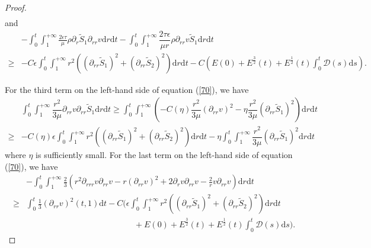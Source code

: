 \documentclass[10pt,reqno]{amsart}
\numberwithin{equation}{section}
\begin{document}
\begin{proof}
\begin{equation}
\begin{aligned}
			\end{aligned}
		\end{equation}
		and
		\begin{equation}\nonumber
			\begin{aligned}
				&-\int_{0}^{t}\int_{1}^{+\infty}\frac{2\epsilon\tau}{\mu}\rho\partial_{r} \tilde{S}_1\partial_{rr}v\mathrm{d}r\mathrm{d}t
				-\int_{0}^{t}\int_{1}^{+\infty}\dfrac{2\tau\epsilon}{\mu r}\rho \partial_{rr}v\tilde{S}_1\mathrm{d}r\mathrm{d}t\\
				\geq&-C\epsilon\int_{0}^{t}\int_{1}^{+\infty}r^2\left((\partial_{rr} \tilde{S}_1)^2+(\partial_{rr} \tilde{S}_2)^2\right)\mathrm{d}r\mathrm{d}t
				-C\left(E(0)+ E^{\frac{3}{2}}(t)+ E^{\frac{1}{2}}(t) \int_{0}^{t}\mathcal{D}(s)\mathrm{d}s\right).
			\end{aligned}
		\end{equation}
		
		For the third term on the left-hand side of equation (\ref{70}), we have
		\begin{equation}
			\begin{aligned}
				&\int_{0}^{t}\int_{1}^{+\infty}\dfrac{r^2}{3\mu}\partial_{rr} v\partial_{rr} \tilde{S}_1\mathrm{d}r\mathrm{d}t
				\geq \int_{0}^{t}\int_{1}^{+\infty}\left(-C(\eta) \dfrac{r^2}{3\mu}(\partial_{rr} v)^2
				- \eta \dfrac{r^2}{3\mu}(\partial_{rr} \tilde{S}_1)^2\right) \mathrm{d}r\mathrm{d}t\\
				\geq& -C(\eta)\epsilon\int_{0}^{t}\int_{1}^{+\infty}r^2\left((\partial_{rr} \tilde{S}_1)^2+(\partial_{rr} \tilde{S}_2)^2\right)\mathrm{d}r\mathrm{d}t
				-\eta \int_{0}^{t}\int_{1}^{+\infty}\dfrac{r^2}{3\mu}(\partial_{rr} \tilde{S}_1)^2\mathrm{d}r\mathrm{d}t
			\end{aligned}
		\end{equation}
		where $\eta$ is sufficiently small.
		For the last term on the left-hand side of equation (\ref{70}), we have
			\begin{align*}
				&-\int_{0}^{t}\int_{1}^{+\infty}\frac{2}{3}\left(r^2\partial_{rrr}v \partial_{rr}v-r(\partial_{rr} v)^2+2\partial_{r}v\partial_{rr}v-\frac{2}{r}v\partial_{rr} v\right)\mathrm{d}r\mathrm{d}t\\
				\geq&\int_{0}^{t}\frac{1}{3}(\partial_{rr} v)^2(t,1) \mathrm{d}t
				-C\bigg(\epsilon\int_{0}^{t}\int_{1}^{+\infty}r^2\left((\partial_{rr} \tilde{S}_1)^2+(\partial_{rr} \tilde{S}_2)^2\right)\mathrm{d}r\mathrm{d}t\\
				&\qquad\qquad\qquad\qquad\qquad\qquad\quad+
				E(0)+ E^{\frac{3}{2}}(t)+ E^{\frac{1}{2}}(t) \int_{0}^{t}\mathcal{D}(s)\mathrm{d}s\bigg).
			\end{align*}
		

\end{proof}
\end{document}
